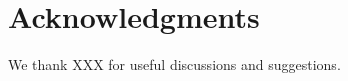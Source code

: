 \documentclass[useAMS,usenatbib]{mn2e}
\begin{document}
\section*{Acknowledgments}

We thank XXX for useful discussions and suggestions.



% 
% 
% 
% 






 





\label{lastpage} \bsp
\end{document}
